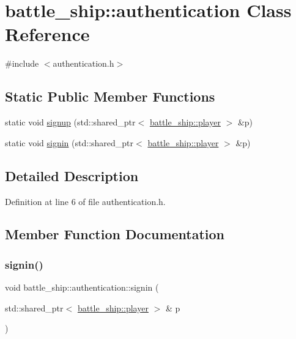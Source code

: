 \hypertarget{classbattle__ship_1_1authentication}{}\section{battle\+\_\+ship\+:\+:authentication Class Reference}
\label{classbattle__ship_1_1authentication}


{\ttfamily \#include $<$authentication.\+h$>$}

\subsection*{Static Public Member Functions}
\begin{DoxyCompactItemize}
\item 
static void \hyperlink{classbattle__ship_1_1authentication_a993bb7db96fad95852d23c7060ce9f06}{signup} (std\+::shared\+\_\+ptr$<$ \hyperlink{classbattle__ship_1_1player}{battle\+\_\+ship\+::player} $>$ \&p)
\item 
static void \hyperlink{classbattle__ship_1_1authentication_a2723d4a392580c76cd01a35a2200c58b}{signin} (std\+::shared\+\_\+ptr$<$ \hyperlink{classbattle__ship_1_1player}{battle\+\_\+ship\+::player} $>$ \&p)
\end{DoxyCompactItemize}


\subsection{Detailed Description}


Definition at line 6 of file authentication.\+h.



\subsection{Member Function Documentation}
\mbox{\label{classbattle__ship_1_1authentication_a2723d4a392580c76cd01a35a2200c58b}} 
\subsubsection{\texorpdfstring{signin()}{signin()}}
{\footnotesize\ttfamily void battle\+\_\+ship\+::authentication\+::signin (\begin{DoxyParamCaption}\item[{std\+::shared\+\_\+ptr$<$ \hyperlink{classbattle__ship_1_1player}{battle\+\_\+ship\+::player} $>$ \&}]{p }\end{DoxyParamCaption})\hspace{0.3cm}{\ttfamily [static]}}



